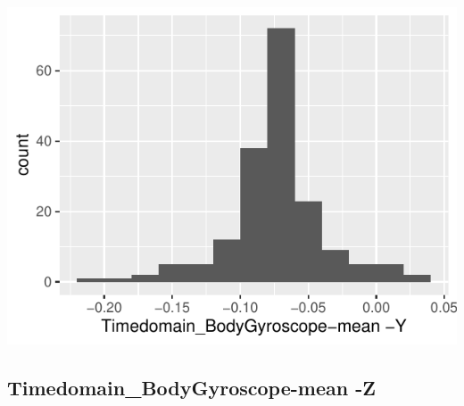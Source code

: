 \documentclass[
]{article}
\begin{document}
\begin{minipage}{0.25 \textwidth}

\includegraphics{codebook_tidydatasub_files/figure-latex/Var-22-Timedomain-BodyGyroscope-mean--Y-1.pdf}

\end{minipage}

\noindent\makebox[\linewidth]{\rule{\textwidth}{0.4pt}}

\hypertarget{timedomain_bodygyroscope-mean--z}{%
\subsection{Timedomain\_BodyGyroscope-mean
-Z}\label{timedomain_bodygyroscope-mean--z}}
\end{document}
